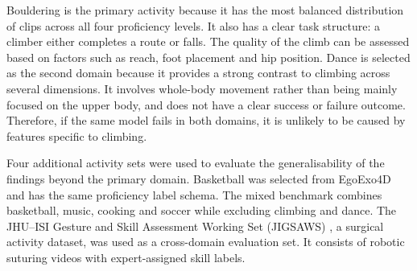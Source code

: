 \documentclass[logo,msc]{infthesis}
\begin{document}
Bouldering is the primary activity because it has the most balanced
distribution of clips across all four proficiency levels. It also has a
clear task structure: a climber either completes a route or falls. The
quality of the climb can be assessed based on factors such as reach, foot
placement and hip position. Dance is selected as the second domain because
it provides a strong contrast to climbing across several dimensions. It
involves whole-body movement rather than being mainly focused on the upper
body, and does not have a clear success or failure outcome. Therefore, if
the same model fails in both domains, it is unlikely to be caused by
features specific to climbing.

Four additional activity sets were used to evaluate the generalisability of
the findings beyond the primary domain. Basketball was selected from
EgoExo4D and has the same proficiency label schema. The mixed benchmark
combines basketball, music, cooking and soccer while excluding climbing and
dance. The JHU--ISI Gesture and Skill Assessment Working Set (JIGSAWS)
\citep{gao2014}, a surgical activity dataset, was used as a cross-domain
evaluation set. It consists of robotic suturing videos with
expert-assigned skill labels.

\begin{table}[H]
\centering
\caption{Benchmark composition and chance baselines.}
\label{tab:benchmarks}
\small
{}
\end{table}
\end{document}
